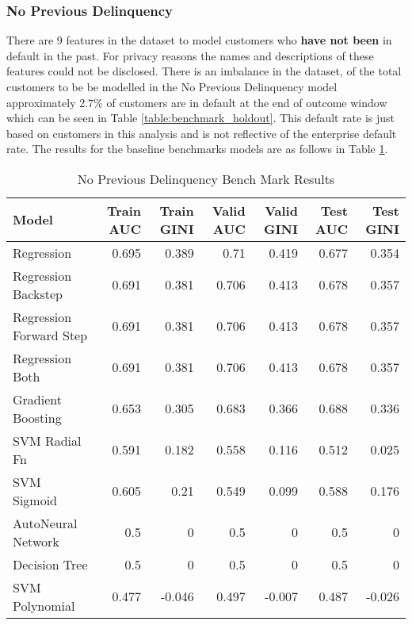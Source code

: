 \subsubsection{No Previous Delinquency}

There are 9 features in the dataset to model customers who \textbf{have not been} in default in the past. For privacy reasons the names and descriptions of these features could not be disclosed. There is an imbalance in the dataset, of the total customers to be be modelled in the No Previous Delinquency model approximately 2.7\% of customers are in default at the end of outcome window which can be seen in Table \ref{table:benchmark_holdout}. This default rate is just based on customers in this analysis and is not reflective of the enterprise default rate. The results for the baseline benchmarks models are as follows in Table \ref{table:NoPreviousDelinquencyBaseModelDetails}.

\begin{table}[H]
	\centering
	\resizebox{\textwidth}{!}
	{
		\begin{tabular}{l | r | r| r |r| r|r}
			\hline
			\textbf{Model} & \textbf{Train AUC} & \textbf{Train GINI} & \textbf{Valid AUC} & \textbf{Valid GINI}& \textbf{Test AUC} & \textbf{Test GINI}\\
			\hline
			\cellcolor{green!25}Regression & \cellcolor{green!25}0.695 & \cellcolor{green!25}0.389 & \cellcolor{green!25}0.71 & \cellcolor{green!25}0.419 & \cellcolor{green!25}0.677 & \cellcolor{green!25}0.354 \\
			Regression Backstep & 0.691 & 0.381 & 0.706 & 0.413 & 0.678 & 0.357 \\
			Regression Forward Step & 0.691 & 0.381 & 0.706 & 0.413 & 0.678 & 0.357 \\
			Regression Both & 0.691 & 0.381 & 0.706 & 0.413 & 0.678 & 0.357 \\
			Gradient Boosting & 0.653 & 0.305 & 0.683 & 0.366 & 0.688 & 0.336 \\
			SVM Radial Fn & 0.591 & 0.182 & 0.558 & 0.116 & 0.512 & 0.025 \\
			SVM Sigmoid & 0.605 & 0.21 & 0.549 & 0.099 & 0.588 & 0.176 \\
			AutoNeural Network & 0.5 & 0 & 0.5 & 0 & 0.5 & 0 \\
			Decision Tree & 0.5 & 0 & 0.5 & 0 & 0.5 & 0 \\
			SVM Polynomial & 0.477 & -0.046 & 0.497 & -0.007 & 0.487 & -0.026 \\
			\hline
		\end{tabular}
	}
	\caption{No Previous Delinquency Bench Mark Results}
	\label{table:NoPreviousDelinquencyBaseModelDetails}
\end{table}

